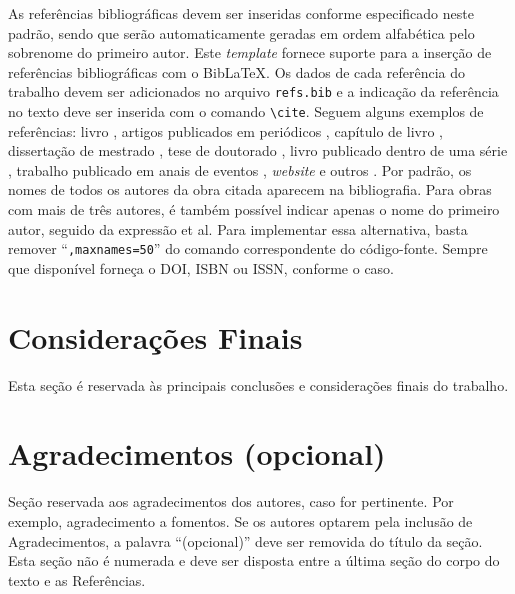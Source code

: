 \documentclass{pssbmac}
\begin{document}
As referências bibliográficas devem ser inseridas conforme especificado neste padrão, sendo que serão automaticamente geradas em ordem alfabética pelo sobrenome do primeiro autor. Este {\it template} fornece suporte para a inserção de referências bibliográficas com o Bib\LaTeX{}. Os dados de cada referência do trabalho devem ser adicionados no arquivo \verb+refs.bib+ e a indicação da referência no texto deve ser inserida com o comando \verb+\cite+. Seguem alguns exemplos de referências: livro \cite{Boldrini}, artigos publicados em periódicos \cite{Contiero,Cuminato}, capítulo de livro \cite{daSilva}, dissertação de mestrado \cite{Diniz}, tese de doutorado \cite{Mallet}, livro publicado dentro de uma série \cite{Gomes}, trabalho publicado em anais de eventos \cite{Santos}, {\it website} e outros \cite{CNMAC}. Por padrão, os nomes de todos os autores da obra citada aparecem na bibliografia. Para obras com mais de três autores, é também possível indicar apenas o nome do primeiro autor, seguido da expressão et al. Para implementar essa alternativa, basta remover ``\verb+,maxnames=50+'' do comando correspondente do código-fonte. Sempre que disponível forneça o DOI, ISBN ou ISSN, conforme o caso.

\section{Considerações Finais}

Esta seção é reservada às principais conclusões e considerações finais do trabalho.

\section*{Agradecimentos (opcional)}

Seção reservada aos agradecimentos dos autores, caso for pertinente. Por exemplo, agradecimento a fomentos. Se os autores optarem pela inclusão de Agradecimentos, a palavra ``(opcional)'' deve ser removida do título da seção. Esta seção não é numerada e deve ser disposta entre a última seção do corpo do texto e as Referências.


\printbibliography
\end{document}
